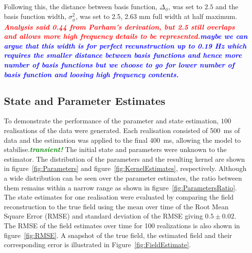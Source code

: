 \documentclass[twocolumn,11pt,a4paper]{article}		%
\newcommand{\parham}[1]{\textsf{\emph{\textbf{\textcolor{blue}{#1}}}}}
\newcommand{\mike}[1]{\textsf{\emph{\textbf{\textcolor{red}{#1}}}}}
\newcommand{\dean}[1]{\textsf{\emph{\textbf{\textcolor{green}{#1}}}}}
\begin{document}
Following this, the distance between basis function, $\Delta_{\phi}$, was set to $2.5$ and the basis function width, $\sigma_{\phi}^2$, was set to 2.5, 2.63 mm full width at half maximum. \mike{Analysis said 0.44 from Parham's derivation, but 2.5 still overlaps and allows more high frequency details to be represented.}\parham{maybe we can argue that this width is for perfect recunstruction up to 0.19 Hz which requires the smaller distance between basis functions and hence more number of basis functions but we choose to go for lower number of basis function and loosing high frequency contents.}

\subsection{State and Parameter Estimates} 
\label{sec:state_and_param_results}
To demonstrate the performance of the parameter and state estimation, $100$ realisations of the data were generated. Each realisation consisted of 500~ms of data and the estimation was applied to the final 400~ms, allowing the model to stabilise.\dean{transient!} The initial state and parameters were unknown to the estimator. The distribution of the parameters and the resulting kernel are shown in figure~\ref{fig:Parameters} and figure~\ref{fig:KernelEstimates}, respectively. Although a wide distribution can be seen over the parameter estimates, the ratio between them remains within a narrow range as shown in figure~\ref{fig:ParametersRatio}. The state estimates for one realisation were evaluated by comparing the field reconstruction to the true field using the mean over time of the Root Mean Square Error (RMSE) and standard deviation of the RMSE giving $0.5\pm 0.02$. The RMSE of the field estimates over time for 100 realizations is also shown in figure~\ref{fig:RMSE}. A snapshot of the true field, the estimated field and their corresponding error is illustrated in Figure~\ref{fig:FieldEstimate}.
\end{document}
